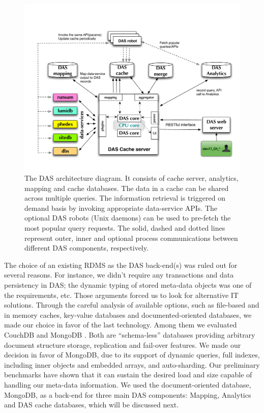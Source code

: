 \documentclass[3p,times]{elsarticle}
\begin{document}
\begin{figure}[htb]
\centering
\includegraphics[width=140mm]{DAS_Cache_and_Analytics.pdf}
\caption{
The DAS architecture diagram. It consists of cache server,
analytics, mapping and cache databases. The data in a cache can be shared
across multiple queries. The information retrieval is triggered
on demand basis by invoking appropriate data-service APIs. The
optional DAS robots (Unix daemons) can be used to pre-fetch
the most popular query requests. The solid, dashed and dotted lines 
represent outer, inner and optional process communications between
different DAS components, respectively.
}
\label{DAS_cache}
\end{figure}

The choice of an existing RDMS as the DAS back-end(s) was ruled out for several reasons. 
For instance, we didn't require any transactions and data persistency in DAS;
the dynamic typing of stored meta-data objects was one of the requirements, etc.
Those arguments forced us to look for alternative IT solutions.
Through the careful analysis of available options, such as file-based and in memory caches, 
key-value databases and documented-oriented databases, we made our choice in favor 
of the last technology. Among them we evaluated CouchDB \cite{CouchDB} and 
MongoDB \cite{MongoDB}. Both are ``schema-less'' databases providing
arbitrary document structure storage, replication and fail-over features. 
We made our decision in favor of MongoDB, due to its support of dynamic queries, 
full indexes, including inner objects and embedded arrays,
and auto-sharding. Our preliminary benchmarks have shown that it can sustain
the desired load and size capable of handling our meta-data information. We used 
the document-oriented database, MongoDB, as a back-end for three 
main DAS components: Mapping, Analytics and DAS cache databases, 
which will be discussed next. 
\end{document}
